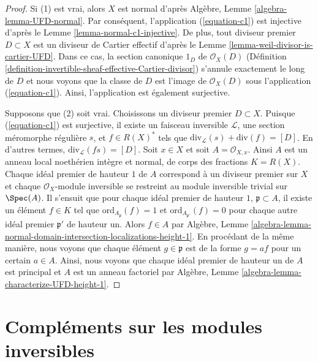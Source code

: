 \begin{proof}
Si (1) est vrai, alors  $X$  est normal d'après Algèbre, Lemme  \ref{algebra-lemma-UFD-normal}.
Par conséquent, l'application (\ref{equation-c1}) est injective d'après le Lemme
 \ref{lemma-normal-c1-injective}. De plus, tout diviseur premier  $D \subset X$  est un diviseur de
Cartier effectif d'après le Lemme  \ref{lemma-weil-divisor-is-cartier-UFD}. Dans ce cas, la section canonique
 $1_D$  de  $\mathcal{O}_X(D)$  (Définition  \ref{definition-invertible-sheaf-effective-Cartier-divisor}) s'annule exactement le long
de  $D$  et nous voyons que la classe de  $D$  est l'image de
 $\mathcal{O}_X(D)$  sous l'application (\ref{equation-c1}). Ainsi, l'application est également
surjective.

\medskip\noindent
Supposons que (2) soit vrai. Choisissons un diviseur premier  $D \subset X$. Puisque
(\ref{equation-c1}) est surjective, il existe un faisceau inversible  $\mathcal{L}$, une
section méromorphe régulière  $s$, et  $f \in R(X)^*$  tels que  $\text{div}_\mathcal{L}(s) + \text{div}(f) = [D]$.
En d'autres termes,  $\text{div}_\mathcal{L}(fs) = [D]$. Soit  $x \in X$  et soit  $A = \mathcal{O}_{X, x}$. Ainsi
 $A$  est un anneau local noethérien intègre et normal, de corps des fractions
 $K = R(X)$. Chaque idéal premier de hauteur  $1$  de  $A$ 
correspond à un diviseur premier sur  $X$  et chaque  $\mathcal{O}_X$-module
inversible se restreint au module inversible trivial sur  $\Spec(A)$. Il s'ensuit
que pour chaque idéal premier de hauteur  $1$,  $\mathfrak p \subset A$, il existe un
élément  $f \in K$  tel que  $\text{ord}_{A_\mathfrak p}(f) = 1$  et  $\text{ord}_{A_{\mathfrak p'}}(f) = 0$  pour chaque autre idéal
premier  $\mathfrak p'$  de hauteur un. Alors  $f \in A$  par Algèbre, Lemme
 \ref{algebra-lemma-normal-domain-intersection-localizations-height-1}. En procédant de la même manière, nous voyons que chaque élément
 $g \in \mathfrak p$  est de la forme  $g = af$  pour un certain  $a \in A$. Ainsi,
nous voyons que chaque idéal premier de hauteur un de  $A$  est principal
et  $A$  est un anneau factoriel par Algèbre, Lemme  \ref{algebra-lemma-characterize-UFD-height-1}.
\end{proof}







\section{Compléments sur les modules inversibles}
\label{section-invertible-modules}

